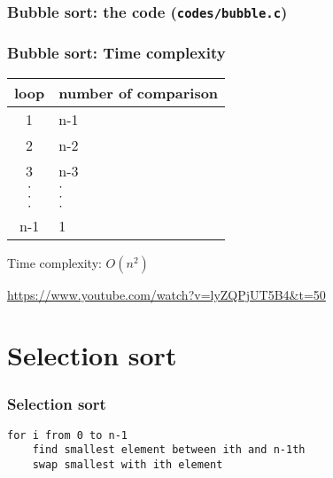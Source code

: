 \documentclass[newPxFont,sthlmFooter,nooffset]{beamer}
\begin{document}
\begin{frame}
  \frametitle{Bubble sort: the code (\texttt{codes/bubble.c})}
  

\end{frame}

\begin{frame}[t]
  \frametitle{Bubble sort: Time complexity}
\begin{center}
  \begin{tabular}{c | p{3cm}}
    loop & \scriptsize{number of comparison} \\ \hline
    1    & n-1 \\
    2    & n-2 \\
    3    & n-3 \\
 $\cdot$ &  $\cdot$ \\
 $\cdot$ &  $\cdot$ \\
 $\cdot$ &  $\cdot$ \\
    n-1  &  1 \\
  \end{tabular}
\end{center}
Time complexity: $O(n^2)$
  
   \vspace{10mm}
\url{https://www.youtube.com/watch?v=lyZQPjUT5B4&t=50}
\end{frame}


\section{Selection sort}

\begin{frame}[t, fragile]
  \frametitle{Selection sort}

  \begin{lstlisting}
for i from 0 to n-1
    find smallest element between ith and n-1th
    swap smallest with ith element
  \end{lstlisting}  
\end{frame}
\end{document}
